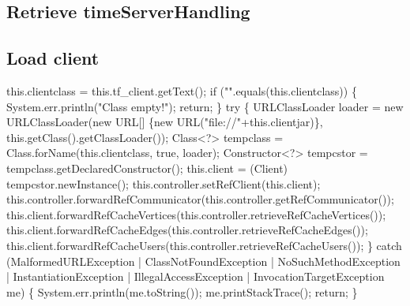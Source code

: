\subsection{Retrieve timeServerHandling}
\nwenddocs{}\endmoddef{}
\nwendcode{}\nwdocspar

\subsection{Load client}
\nwenddocs{}\endmoddef{}
this.clientclass = this.tf_client.getText();
if ("".equals(this.clientclass)) \{
  System.err.println("Class empty!");
  return;
\}
try \{
  URLClassLoader loader = new URLClassLoader(new URL[] \{new URL("file://"+this.clientjar)\},
      this.getClass().getClassLoader());
  Class<?> tempclass = Class.forName(this.clientclass, true, loader);
  Constructor<?> tempcstor = tempclass.getDeclaredConstructor();
  this.client = (Client) tempcstor.newInstance();
  this.controller.setRefClient(this.client);
  this.controller.forwardRefCommunicator(this.controller.getRefCommunicator());
  this.client.forwardRefCacheVertices(this.controller.retrieveRefCacheVertices());
  this.client.forwardRefCacheEdges(this.controller.retrieveRefCacheEdges());
  this.client.forwardRefCacheUsers(this.controller.retrieveRefCacheUsers());
\} catch (MalformedURLException
    | ClassNotFoundException
    | NoSuchMethodException
    | InstantiationException
    | IllegalAccessException
    | InvocationTargetException me) \{
  System.err.println(me.toString());
  me.printStackTrace();
  return;
\}
